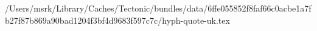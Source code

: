 /Users/msrk/Library/Caches/Tectonic/bundles/data/6ffe055852f8faf66c0acbe1a7fb27f87b869a90bad1204f3bf4d9683f597c7c/hyph-quote-uk.tex